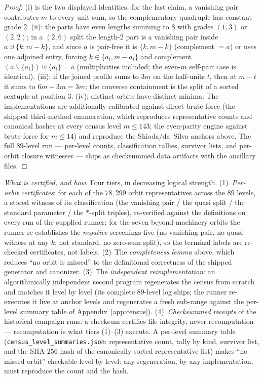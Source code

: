 \documentclass[11pt]{amsart}
\theoremstyle{remark}
\begin{document}
\begin{proof}
(i) is the two displayed identities; for the last claim, a vanishing pair contributes $m$ to
every unit sum, so the complementary quadruple has constant grade $2$. (ii): the parts have even lengths summing to $8$ with grades
$(1,3)$ or $(2,2)$; in a $(2,6)$ split the length-$2$ part is a vanishing pair inside
$a\uplus\{k,m-k\}$, and since $a$ is pair-free it is $\{k,m-k\}$ (complement $=a$) or uses one
adjoined entry, forcing $k\in\{a_i,m-a_i\}$ and complement $(a\smallsetminus\{a_i\})\uplus\{a_i\}=a$
(multiplicities included; the even-$m$ self-pair case is identical). (iii): if the joined profile
sums to $3m$ on the half-units $t$, then at $m-t$ it sums to $6m-3m=3m$; the converse containment
is the split of a sorted sextuple at position $3$. (iv): distinct orbits have distinct minima.
The implementations are additionally calibrated against direct brute force (the shipped
third-method enumeration, which reproduces representative counts and canonical hashes at every
census level $m\le143$; the even-parity engine against brute force for $m\le14$) and
reproduce the Shioda/da~Silva anchors above. The full $89$-level run ---
per-level counts, classification tallies, survivor lists, and per-orbit closure witnesses ---
ships as checksummed data artifacts with the ancillary files.
\end{proof}

\emph{What is certified, and how.} Four tiers, in decreasing logical strength. (1)~\emph{Per-orbit
certificates}: for each of the $78{,}299$ orbit representatives across the $89$ levels, a stored
witness of its classification (the vanishing pair / the quasi split / the standard parameter /
the $*$-split triples), re-verified against the definitions on every run of the supplied runner;
for the seven beyond-machinery orbits the runner re-establishes the \emph{negative} screenings
live (no vanishing pair, no quasi witness at any $k$, not standard, no zero-sum split), so the
terminal labels are re-checked certificates, not labels. (2)~The \emph{completeness lemma}
above, which reduces ``no orbit is missed'' to the definitional correctness of the shipped
generator and canonizer. (3)~The \emph{independent reimplementation}: an algorithmically
independent second program regenerates the census from scratch and matches it level by level
(its complete $89$-level log ships; the runner re-executes it live at anchor levels and
regenerates a fresh sub-range against the per-level summary table of
Appendix~\ref{app:census}). (4)~\emph{Checksummed receipts}
of the historical campaign runs: a checksum certifies file integrity, never recomputation ---
recomputation is what tiers (1)--(3) execute. A per-level summary table
(\texttt{census\_level\_summaries.json}: representative count, tally by kind, survivor list,
and the SHA-256 hash of the canonically sorted representative list) makes ``no missed orbit''
checkable level by level: any regeneration, by any implementation, must reproduce the count and
the hash.
\end{document}
